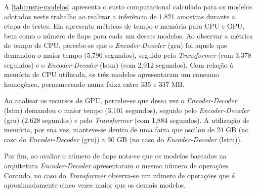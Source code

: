 A \autoref{tab:custo-modelos} apresenta o custo computacional calculado para os modelos adotados neste trabalho ao realizar a inferência de 1.821 amostras durante a etapa de testes. Ela apresenta métricas de tempo e memória para CPU e GPU, bem como o número de \acrfull{flops} para cada um desses modelos.
Ao observar a métrica de tempo de CPU, percebe-se que o \textit{Encoder-Decoder} (\acrshort{gru}) foi aquele que demandou o maior tempo (5,790 segundos), seguido pelo \textit{Transformer} (com 3,378 segundos) e o \textit{Encoder-Decoder} (\acrshort{lstm}) (com 2,912 segundos). 
Com relação à memória de CPU utilizada, os três modelos apresentaram um consumo homogêneo, permanecendo numa faixa entre 335 e 337 MB.



Ao analisar os recursos de GPU, percebe-se que dessa vez o \textit{Encoder-Decoder} (\acrshort{lstm}) demandou o maior tempo (3,101 segundos), seguido pelo \textit{Encoder-Decoder} (\acrshort{gru}) (2,628 segundos) e pelo \textit{Transformer} (com 1,884 segundos). A utilização de memória, por sua vez, manteve-se dentro de uma faixa que oscilou de 24 GB (no caso do \textit{Encoder-Decoder} (\acrshort{gru})) a 30 GB (no caso do \textit{Encoder-Decoder} (\acrshort{lstm})).

Por fim, ao avaliar o número de \acrshort{flops} nota-se que os modelos baseados na arquitetura \textit{Encoder-Decoder} apresentaram o mesmo número de operações. Contudo, no caso do \textit{Transformer} observa-se um número de operações que é aproximadamente cinco vezes maior que os demais modelos.








